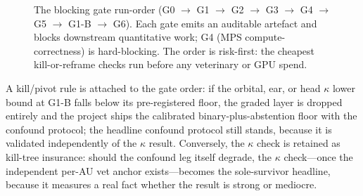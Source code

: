 \begin{figure}[t]
  \centering
  \caption[Gate run-order]{The blocking gate run-order
    (G0 $\rightarrow$ G1 $\rightarrow$ G2 $\rightarrow$ G3 $\rightarrow$ G4
    $\rightarrow$ G5 $\rightarrow$ G1-B $\rightarrow$ G6). Each gate emits an
    auditable artefact and blocks downstream quantitative work; G4 (MPS
    compute-correctness) is hard-blocking. The order is risk-first: the cheapest
    kill-or-reframe checks run before any veterinary or GPU spend.}
  \label{fig:gate-flow}
\end{figure}

A kill/pivot rule is attached to the gate order: if the orbital, ear, or head
$\kappa$ lower bound at G1-B falls below its pre-registered floor, the graded
layer is dropped entirely and the project ships the calibrated
binary-plus-abstention floor with the confound protocol; the headline confound
protocol still stands, because it is validated independently of the $\kappa$
result. Conversely, the $\kappa$ check is retained as kill-tree insurance: should
the confound leg itself degrade, the $\kappa$ check---once the independent per-AU
vet anchor exists---becomes the sole-survivor headline, because it measures a
real fact whether the result is strong or mediocre.

